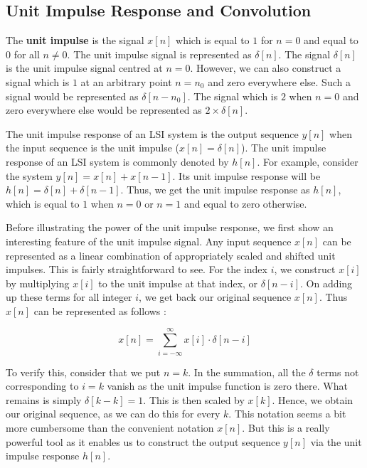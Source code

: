 \documentclass{article}
\theoremstyle{definition}
\begin{document}
	 \subsection{Unit Impulse Response and Convolution}
	 
	 The \textbf{unit impulse} is the signal $x[n]$ which is equal to $1$ for $n=0$ and equal to $0$ for all $n \neq 0$. The unit impulse signal is represented as $\delta[n]$. The signal $\delta[n]$ is the unit impulse signal centred at $n=0$. However, we can also construct a signal which is $1$ at an arbitrary point $n=n_0$ and zero everywhere else. Such a signal would be represented as $\delta[n-n_0]$. The signal which is $2$ when $n=0$ and zero everywhere else would be represented as $2 \times \delta[n]$. \smallskip
	 
	 The unit impulse response of an LSI system is the output sequence $y[n]$ when the input sequence is the unit impulse ($x[n] = \delta[n]$). The unit impulse response of an LSI system is commonly denoted by $h[n]$. For example, consider the system $y[n] = x[n] + x[n-1]$. Its unit impulse response will be $h[n] = \delta[n] + \delta[n-1]$. Thus, we get the unit impulse response as $h[n]$, which is equal to $1$ when $n=0$ or $n=1$ and equal to zero otherwise. \smallskip
	 
	 Before illustrating the power of the unit impulse response, we first show an interesting feature of the unit impulse signal. Any input sequence $x[n]$ can be represented as a linear combination of appropriately scaled and shifted unit impulses. This is fairly straightforward to see. For the index $i$, we construct $x[i]$ by multiplying $x[i]$ to the unit impulse at that index, or $\delta[n-i]$. On adding up these terms for all integer $i$, we get back our original sequence $x[n]$. Thus $x[n]$ can be represented as follows : 
	 
	 \[
	 		x[n] = \sum_{i=- \infty}^{\infty} x[i] \cdot \delta[n-i]
	 \]
	 
	 To verify this, consider that we put $n=k$. In the summation, all the $\delta$ terms not corresponding to $i=k$ vanish as the unit impulse function is zero there. What remains is simply $\delta[k-k] = 1$. This is then scaled by $x[k]$. Hence, we obtain our original sequence, as we can do this for every $k$. This notation seems a bit more cumbersome than the convenient notation $x[n]$. But this is a really powerful tool as it enables us to construct the output sequence $y[n]$ via the unit impulse response $h[n]$. \smallskip
	 
\end{document}
